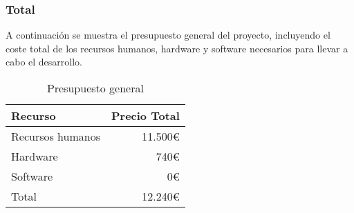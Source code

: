 \subsubsection{Total}
A continuación se muestra el presupuesto general del proyecto, incluyendo el
coste total de los recursos humanos, hardware y software necesarios para llevar
a cabo el desarrollo.

\begin{table}
    \centering
    \begin{tabular}[H]{l|r}
        \textbf{Recurso} & \textbf{Precio Total} \\
        \hline
        Recursos humanos & 11.500\euro           \\
        Hardware         & 740\euro              \\
        Software         & 0\euro                \\
        \hline
        Total            & 12.240\euro           \\
    \end{tabular}
    \caption{Presupuesto general}
    \label{tab:total-budget}
\end{table}

\break


\pagebreak